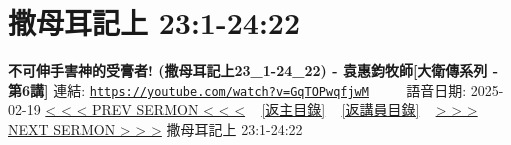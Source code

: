 \documentclass{book}
\begin{document}
\section{撒母耳記上 23:1-24:22}
\label{sec:GqTOPwqfjwM}
\textbf{不可伸手害神的受膏者! (撒母耳記上23\_1-24\_22) - 袁惠鈞牧師[大衛傳系列 - 第6講]}
\newline
\newline
連結: \href{https://youtube.com/watch?v=GqTOPwqfjwM}{\texttt{https://youtube.com/watch?v=GqTOPwqfjwM}} ~~~~ 語音日期: 2025-02-19
\newline
\newline
\hyperref[sec:WCt7vYrgwVY]{< < < PREV SERMON < < <}
~
\hyperlink{toc}{[返主目錄]}
~
\hyperref[ch:preacher11]{[返講員目錄]}
~
\hyperref[sec:86NlAlqZbEc]{> > > NEXT SERMON > > >}
\newline
\newline
撒母耳記上 23:1-24:22
\newline
\end{document}
